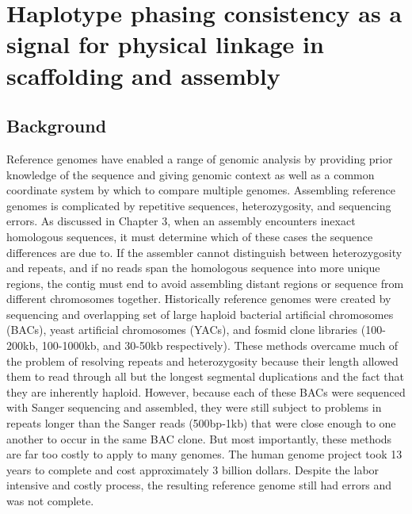 %
\chapter{Haplotype phasing consistency as a signal for physical linkage in scaffolding and assembly}

\ifpdf
    \graphicspath{{Chapter4/Figs/Raster/}{Chapter4/Figs/PDF/}{Chapter4/Figs/}}
\else
    \graphicspath{{Chapter4/Figs/Vector/}{Chapter4/Figs/}}
\fi



\section{Background}
\par{
Reference genomes have enabled a range of genomic analysis by providing prior knowledge of the sequence 
and giving genomic context as well as a common coordinate system by which to compare multiple genomes\cite{1000genomes}\cite{GRCh38}. Assembling reference genomes is complicated by repetitive sequences, heterozygosity, and sequencing errors. As discussed in Chapter 3, when an assembly encounters inexact homologous sequences, it must determine which of these cases the sequence differences are due to. 
If the assembler cannot distinguish between heterozygosity and repeats, and if no reads span the homologous sequence into more unique regions, the contig must end
to avoid assembling distant regions or sequence from different chromosomes together. Historically reference genomes were created by sequencing and overlapping set of large haploid bacterial artificial chromosomes (BACs), yeast artificial chromosomes (YACs), and fosmid clone libraries \cite{human} (100-200kb, 100-1000kb, and 30-50kb respectively). 
These methods overcame much of the problem of resolving repeats and heterozygosity because their length allowed them to read through all but the longest segmental duplications and the fact that they are inherently haploid. However, because each of these BACs were sequenced with Sanger sequencing and assembled, they were still subject to problems in repeats longer than the Sanger reads (500bp-1kb) that were close enough to one another to occur in the same BAC clone. But most importantly, these methods are far too costly to apply to many genomes. The human genome project took 13 years to complete and cost approximately 3 billion dollars\cite{genomeproject}. Despite the labor intensive and costly process, the resulting reference genome still had errors and was not complete\cite{renamegrch38}.
} 

